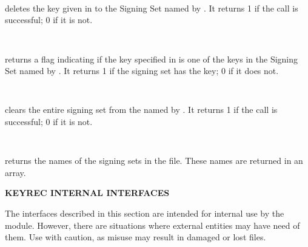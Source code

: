 \begin{description}
\item {}\verb" "

 deletes the key given in  to
the Signing Set named by .  It returns 1 if the call
is successful; 0 if it is not.

\item {}\verb" "

 returns a flag indicating if the key
specified in  is one of the keys in the Signing Set named by
.  It returns 1 if the signing set has the key; 0 if
it does not.

\item {}\verb" "

 clears the entire signing set from the
 named by .  It returns 1 if the call is
successful; 0 if it is not.

\item {}\verb" "

 returns the names of the signing sets in the
 file.  These names are returned in an array.

\end{description}

{\bf KEYREC INTERNAL INTERFACES}

The interfaces described in this section are intended for internal use by the
 module.  However, there are situations where external
entities may have need of them.  Use with caution, as misuse may result in
damaged or lost  files.

